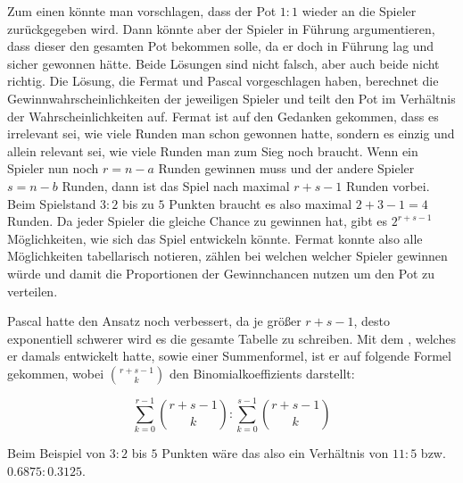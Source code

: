 Zum einen könnte man vorschlagen, dass der Pot $1:1$ wieder an die Spieler zurückgegeben wird. Dann könnte aber der Spieler in Führung argumentieren, dass dieser den gesamten Pot bekommen solle, da er doch in Führung lag und sicher gewonnen hätte. Beide Lösungen sind nicht falsch, aber auch beide nicht richtig. Die Lösung, die Fermat und Pascal vorgeschlagen haben, berechnet die Gewinnwahrscheinlichkeiten der jeweiligen Spieler und teilt den Pot im Verhältnis der Wahrscheinlichkeiten auf. Fermat ist auf den Gedanken gekommen, dass es irrelevant sei, wie viele Runden man schon gewonnen hatte, sondern es einzig und allein relevant sei, wie viele Runden man zum Sieg noch braucht. Wenn ein Spieler nun noch $r=n-a$ Runden gewinnen muss und der andere Spieler $s=n-b$ Runden, dann ist das Spiel nach maximal $r+s-1$ Runden vorbei. Beim Spielstand $3:2$ bis zu $5$ Punkten braucht es also maximal $2+3-1=4$ Runden. Da jeder Spieler die gleiche Chance zu gewinnen hat, gibt es $2^{r+s-1}$ Möglichkeiten, wie sich das Spiel entwickeln könnte. Fermat konnte also alle Möglichkeiten tabellarisch notieren, zählen bei welchen welcher Spieler gewinnen würde und damit die Proportionen der Gewinnchancen nutzen um den Pot zu verteilen.

Pascal hatte den Ansatz noch verbessert, da je größer $r+s-1$, desto exponentiell schwerer wird es die gesamte Tabelle zu schreiben. Mit dem , welches er damals entwickelt hatte, sowie einer Summenformel, ist er auf folgende Formel gekommen, wobei $\binom{r+s-1}{k}$ den \Glspl{Binomialkoeffizient} darstellt:

\[ \sum^{r-1}_{k=0} \binom{r+s-1}{k} : \sum^{s-1}_{k=0} \binom{r+s-1}{k} \]

Beim Beispiel von $3:2$ bis $5$ Punkten wäre das also ein Verhältnis von $11:5$ bzw. $0.6875:0.3125$.
